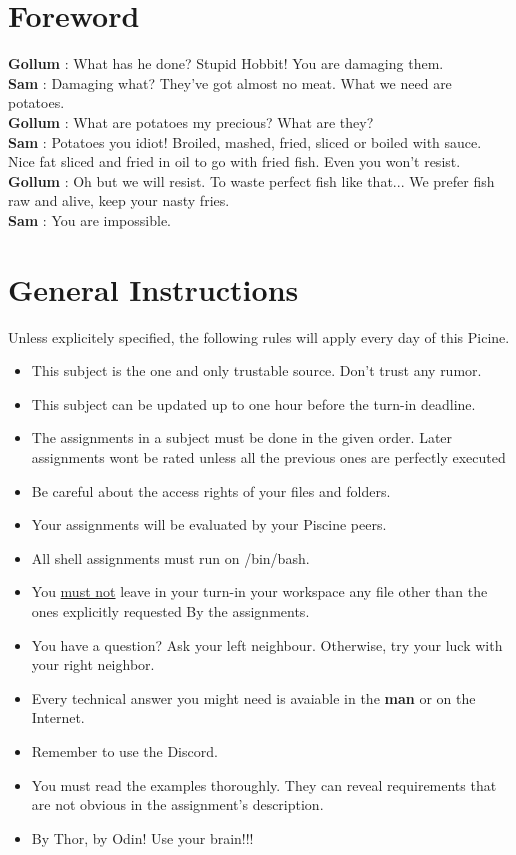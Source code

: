 \documentclass[12pt, a4paper]{report}
\begin{document}
\newpage

\chapter{Foreword}
	\normalsize \textbf{Gollum} : What has he done? Stupid Hobbit! You are damaging them.\vspace{.2cm}\\
	\textbf{Sam} : Damaging what? They've got almost no meat. What we need are potatoes.\vspace{.2cm}\\
	\textbf{Gollum} : What are potatoes my precious? What are they?\vspace{.2cm}\\
	\textbf{Sam} : Potatoes you idiot! Broiled, mashed, fried, sliced or boiled with sauce. Nice fat \indent \indent sliced and fried in oil to go with fried fish. Even you won't resist.\vspace{.2cm}\\
	\textbf{Gollum} : Oh but we will resist. To waste perfect fish like that... We prefer fish raw \indent \indent and alive, keep your nasty fries.\vspace{.2cm}\\
	\textbf{Sam} : You are impossible.

\chapter{General Instructions}
Unless explicitely specified, the following rules will apply every day of this Picine.
	\begin{itemize}
		\item This subject is the one and only trustable source. Don't trust any rumor.
		\item This subject can be updated up to one hour before the turn-in deadline.
		\item The assignments in a subject must be done in the given order. Later assignments
				wont be rated unless all the previous ones are perfectly executed
		\item Be careful about the access rights of your files and folders.
		\item Your assignments will be evaluated by your Piscine peers.
		\item All shell assignments must run on /bin/bash.
		\item You \underline{must not} leave in your turn-in your workspace any file other than the ones
				explicitly requested By the assignments.
		\item You have a question? Ask your left neighbour. Otherwise, try your luck with your
				right neighbor.
		\item Every technical answer you might need is avaiable in the \textbf{man} or on the Internet.
		\item Remember to use the Discord.
		\item You must read the examples thoroughly. They can reveal requirements that are not obvious in
				the assignment's description.
		\item By Thor, by Odin! Use your brain!!!
		\end{itemize}
\end{document}
